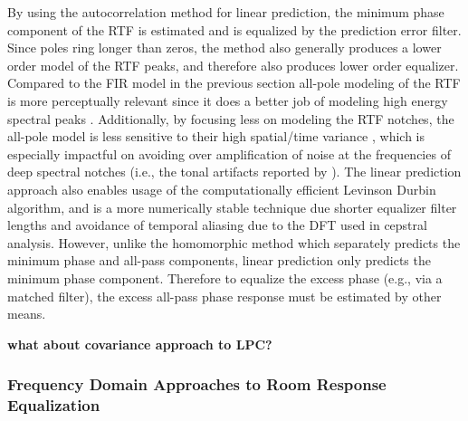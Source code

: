 By using the autocorrelation method for linear prediction, the minimum phase component of the RTF is estimated and is equalized by the prediction error filter. Since poles ring longer than zeros, the method also generally produces a lower order model of the RTF peaks, and therefore also produces lower order equalizer. Compared to the FIR model in the previous section all-pole modeling of the RTF is more perceptually relevant since it does a better job of modeling high energy spectral peaks \citep{toole1988modification}. Additionally, by focusing less on modeling the RTF notches, the all-pole model is less sensitive to their high spatial/time variance  \citep{mourjopoulos1985variation}, which is especially impactful on avoiding over amplification of noise at the frequencies of deep spectral notches (i.e., the tonal artifacts reported by \cite{neely1979invertibility}). The linear prediction approach also enables usage of the computationally efficient Levinson Durbin algorithm, and is a more numerically stable technique due shorter equalizer filter lengths and avoidance of temporal aliasing due to the DFT used in cepstral analysis. However, unlike the homomorphic method which separately predicts the minimum phase and all-pass components, linear prediction only predicts the minimum phase component. Therefore to equalize the excess phase (e.g., via a matched filter), the excess all-pass phase response must be estimated by other means. 

\textbf{what about covariance approach to LPC?}

\subsubsection{Frequency Domain Approaches to Room Response Equalization}

